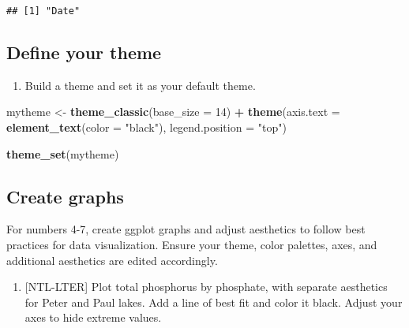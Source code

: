 \documentclass[]{article}
\newenvironment{Shaded}{\begin{snugshade}}{\end{snugshade}}
\newcommand{\KeywordTok}[1]{\textcolor[rgb]{0.13,0.29,0.53}{\textbf{#1}}}
\newcommand{\DataTypeTok}[1]{\textcolor[rgb]{0.13,0.29,0.53}{#1}}
\newcommand{\DecValTok}[1]{\textcolor[rgb]{0.00,0.00,0.81}{#1}}
\newcommand{\StringTok}[1]{\textcolor[rgb]{0.31,0.60,0.02}{#1}}
\newcommand{\OperatorTok}[1]{\textcolor[rgb]{0.81,0.36,0.00}{\textbf{#1}}}
\newcommand{\NormalTok}[1]{#1}
\providecommand{\tightlist}{%
  \setlength{\itemsep}{0pt}\setlength{\parskip}{0pt}}
\begin{document}
\begin{verbatim}
## [1] "Date"
\end{verbatim}

\subsection{Define your theme}\label{define-your-theme}

\begin{enumerate}
\def\labelenumi{\arabic{enumi}.}
\setcounter{enumi}{2}
\tightlist
\item
  Build a theme and set it as your default theme.
\end{enumerate}

\begin{Shaded}
\begin{Highlighting}[]
\NormalTok{mytheme <-}\StringTok{ }\KeywordTok{theme_classic}\NormalTok{(}\DataTypeTok{base_size =} \DecValTok{14}\NormalTok{) }\OperatorTok{+}
\StringTok{  }\KeywordTok{theme}\NormalTok{(}\DataTypeTok{axis.text =} \KeywordTok{element_text}\NormalTok{(}\DataTypeTok{color =} \StringTok{"black"}\NormalTok{), }
        \DataTypeTok{legend.position =} \StringTok{"top"}\NormalTok{)}

\KeywordTok{theme_set}\NormalTok{(mytheme)}
\end{Highlighting}
\end{Shaded}

\subsection{Create graphs}\label{create-graphs}

For numbers 4-7, create ggplot graphs and adjust aesthetics to follow
best practices for data visualization. Ensure your theme, color
palettes, axes, and additional aesthetics are edited accordingly.

\begin{enumerate}
\def\labelenumi{\arabic{enumi}.}
\setcounter{enumi}{3}
\tightlist
\item
  {[}NTL-LTER{]} Plot total phosphorus by phosphate, with separate
  aesthetics for Peter and Paul lakes. Add a line of best fit and color
  it black. Adjust your axes to hide extreme values.
\end{enumerate}
\end{document}
